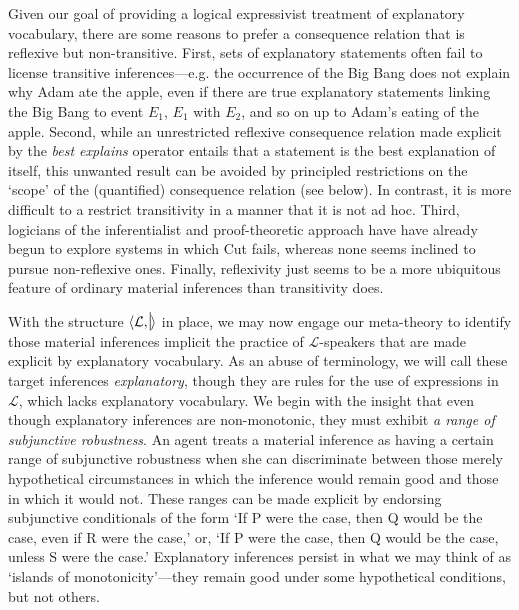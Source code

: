 \documentclass{article}
\newcommand{\nc}{\turnstile{s}{w}{}{}{n}}
\begin{document}
Given our goal of providing a logical expressivist treatment of explanatory vocabulary, there are some reasons to prefer a consequence relation that is reflexive but non-transitive. First, sets of explanatory statements often fail to license transitive inferences---e.g. the occurrence of the Big Bang does not explain why Adam ate the apple, even if there are true explanatory statements linking the Big Bang to event $E_1$, $ E_1 $ with $ E_2 $, and so on up to Adam's eating of the apple. Second, while an unrestricted reflexive consequence relation made explicit by the \textit{best explains} operator entails that a statement is the best explanation of itself, this unwanted result can be avoided by principled restrictions on the `scope' of the (quantified) consequence relation (see below). In contrast, it is more difficult to a restrict transitivity in a manner that it is not ad hoc. Third, logicians of the inferentialist and proof-theoretic approach have have already begun to explore systems in which Cut fails, whereas none seems inclined to pursue non-reflexive ones. Finally, reflexivity just seems to be a more ubiquitous feature of ordinary material inferences than transitivity does.

With the structure $ \langle  \mathcal{L}, \nc \rangle  $ in place, we may now engage our meta-theory to identify those material inferences implicit the practice of $ \mathcal{L} $-speakers that are made explicit by explanatory vocabulary. As an abuse of terminology, we will call these target inferences \textit{explanatory}, though they are rules for the use of expressions in $\mathcal{L} $, which lacks explanatory vocabulary. We begin with the insight that even though explanatory inferences are non-monotonic, they must exhibit \textit{a range of subjunctive robustness}. An agent treats a material inference as having a certain range of subjunctive robustness when she can discriminate between those merely hypothetical circumstances in which the inference would remain good and those in which it would not. These ranges can be made explicit by endorsing subjunctive conditionals of the form `If P were the case, then Q would be the case, even if R were the case,' or, `If P were the case, then Q would be the case, unless S were the case.' Explanatory inferences persist in what we may think of as `islands of monotonicity'---they remain good under some hypothetical conditions, but not others. 
\end{document}
